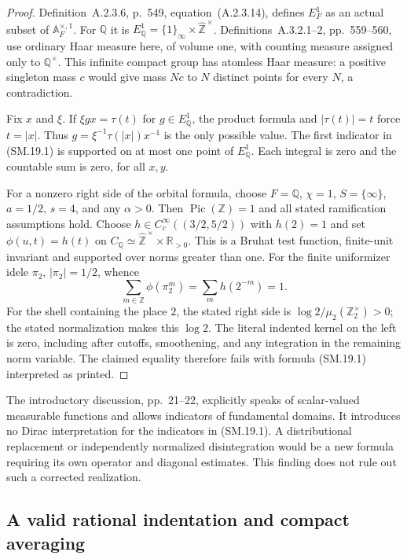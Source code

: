 \begin{proof}
Definition~A.2.3.6, p.~549, equation~(A.2.3.14), defines
$E_F^1$ as an actual subset of $\mathbb A_F^{\times,1}$.
For $\mathbb Q$ it is
$E_{\mathbb Q}^1=\{1\}_\infty\times\widehat{\mathbb Z}^{\,\times}$.
Definitions~A.3.2.1--2, pp.~559--560, use ordinary Haar measure
here, of volume one, with counting measure assigned only to
$\mathbb Q^\times$.  This infinite compact group has atomless
Haar measure: a positive singleton mass $c$ would give mass
$Nc$ to $N$ distinct points for every $N$, a contradiction.

Fix $x$ and $\xi$.  If $\xi gx=\tau(t)$ for $g\in E_{\mathbb Q}^1$,
the product formula and $|\tau(t)|=t$ force $t=|x|$.
Thus $g=\xi^{-1}\tau(|x|)x^{-1}$ is the only possible value.
The first indicator in (SM.19.1) is supported on at most one
point of $E_{\mathbb Q}^1$.  Each integral is zero and the
countable sum is zero, for all $x,y$.

For a nonzero right side of the orbital formula, choose
$F=\mathbb Q$, $\chi=1$, $S=\{\infty\}$, $a=1/2$, $s=4$,
and any $\alpha>0$.  Then $\operatorname{Pic}(\mathbb Z)=1$
and all stated ramification assumptions hold.
Choose $h\in C_c^\infty((3/2,5/2))$ with $h(2)=1$ and set
$\phi(u,t)=h(t)$ on
$C_{\mathbb Q}\simeq\widehat{\mathbb Z}^{\,\times}\times\mathbb R_{>0}$.
This is a Bruhat test function, finite-unit invariant and
supported over norms greater than one.  For the finite uniformizer
idele $\pi_2$, $|\pi_2|=1/2$, whence
\[
 \sum_{m\in\mathbb Z}\phi(\pi_2^m)
       =\sum_mh(2^{-m})=1.
\]
For the shell containing the place $2$, the stated right side is
$\log2/\mu_2(\mathbb Z_2^\times)>0$; the stated normalization
makes this $\log2$.  The literal indented kernel on the left
is zero, including after cutoffs, smoothening, and any integration
in the remaining norm variable.  The claimed equality therefore
fails with formula (SM.19.1) interpreted as printed.
\end{proof}

The introductory discussion, pp.~21--22, explicitly speaks of
scalar-valued measurable functions and allows indicators of
fundamental domains.  It introduces no Dirac interpretation
for the indicators in (SM.19.1).  A distributional replacement
or independently normalized disintegration would be a new
formula requiring its own operator and diagonal estimates.
This finding does not rule out such a corrected realization.

\subsection{A valid rational indentation and compact averaging}

